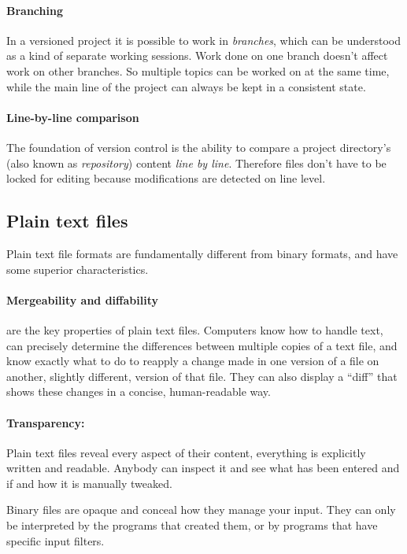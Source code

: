 \documentclass[11pt,a4paper]{article}
\begin{document}
\paragraph{Branching}
In a versioned project it is possible to work in \emph{branches}, which can be
understood as a kind of separate working sessions. Work done on one branch doesn't affect
work on other branches. So multiple topics can be worked on at the same time, while
the main line of the project can always be kept in a consistent state.

\paragraph{Line-by-line comparison}
The foundation of version control is the ability to compare a project directory's (also
known as \emph{repository}) content \emph{line by line}. Therefore files don't have to
be locked for editing because modifications are detected on line level.

\subsection{Plain text files}
Plain text file formats are fundamentally different from binary formats,
and have some superior characteristics.

\paragraph{Mergeability and diffability}
are the key properties of plain text files.  Computers know how to handle text,
can precisely determine the differences between multiple copies of a text file,
and know exactly what to do to reapply a change made in one version of a file
on another, slightly different, version of that file.
They can also display a “diff” that shows these changes in a concise, human-readable way.

\paragraph{Transparency:}
Plain text files reveal every aspect of their content, everything is explicitly written
and readable. Anybody can inspect it and see what has been entered and if and how it is
manually tweaked. 

Binary files are opaque and conceal how they manage your input. They can only be
interpreted by the programs that created them, or by programs that have specific input filters.
\end{document}
